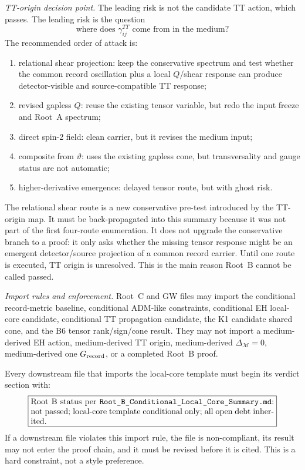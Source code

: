 \documentclass[11pt]{article}
\begin{document}
\medskip\noindent\textit{TT-origin decision point.}
The leading risk is not the candidate TT action, which passes.  The leading
risk is the question
\[
\boxed{\text{where does }\gamma^{TT}_{ij}\text{ come from in the medium?}}
\]
The recommended order of attack is:
\begin{enumerate}
\item relational shear projection: keep the conservative spectrum and test
  whether the common record oscillation plus a local \(Q\)/shear response can
  produce detector-visible and source-compatible TT response;
\item revised gapless \(Q\): reuse the existing tensor variable, but redo the
  input freeze and Root~A spectrum;
\item direct spin-2 field: clean carrier, but it revises the medium input;
\item composite from \(\vartheta\): uses the existing gapless cone, but
  transversality and gauge status are not automatic;
\item higher-derivative emergence: delayed tensor route, but with ghost risk.
\end{enumerate}
The relational shear route is a new conservative pre-test introduced by the
TT-origin map.  It must be back-propagated into this summary because it was
not part of the first four-route enumeration.  It does not upgrade the
conservative branch to a proof: it only asks whether the missing tensor
response might be an emergent detector/source projection of a common record
carrier.
Until one route is executed, TT origin is unresolved.  This is the main
reason Root~B cannot be called passed.

\medskip\noindent\textit{Import rules and enforcement.}
Root~C and GW files may import the conditional record-metric baseline,
conditional ADM-like constraints, conditional EH local-core candidate,
conditional TT propagation candidate, the K1 candidate shared cone, and the
B6 tensor rank/sign/cone result.  They may not import a medium-derived EH
action, medium-derived TT origin, medium-derived
\(\Delta_{\mathcal M}=0\), medium-derived one \(G_{\rm record}\), or a
completed Root~B proof.

Every downstream file that imports the local-core template must begin its
verdict section with:
\[
\boxed{
\begin{minipage}{0.86\linewidth}
Root~B status per \texttt{Root\_B\_Conditional\_Local\_Core\_Summary.md}:
not passed; local-core template conditional only; all open debt inherited.
\end{minipage}}
\]
If a downstream file violates this import rule, the file is non-compliant, its
result may not enter the proof chain, and it must be revised before it is
cited.  This is a hard constraint, not a style preference.
\end{document}
